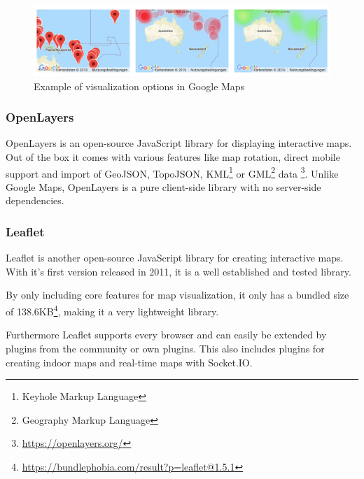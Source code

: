 \begin{figure}[!hb]
	\centering
	\includegraphics[width=1\linewidth]{images/GoogleMapsHeatmap}
	\caption{Example of visualization options in Google Maps}
	\label{fig:GoogleMapsHeatmap}
\end{figure}

\subsubsection{OpenLayers}
\label{OpenLayers}

OpenLayers is an open-source JavaScript library for displaying interactive maps. Out of the box it comes with various features like map rotation, direct mobile support and import of GeoJSON, TopoJSON, KML\footnote{Keyhole Markup Language} or GML\footnote{Geography Markup Language} data \footnote{\url{https://openlayers.org/}}. Unlike Google Maps, OpenLayers is a pure client-side library with no server-side dependencies. 



\subsubsection{Leaflet}
\label{Leaflet}

Leaflet is another open-source JavaScript library for creating interactive maps. With it's first version released in 2011, it is a well established and tested library. 

By only including core features for map visualization, it only has a bundled size of 138.6KB\footnote{\url{https://bundlephobia.com/result?p=leaflet@1.5.1}}, making it a very lightweight library.

Furthermore Leaflet supports every browser and can easily be extended by plugins from the community or own plugins.
This also includes plugins for creating indoor maps \cite{baines_provides_2019} and real-time maps with Socket.IO.


